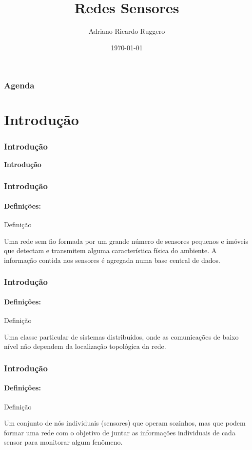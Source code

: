\documentclass[notes]{beamer}
\title{Redes Sensores}
\subtitle{}
\author{Adriano Ricardo Ruggero}
\institute{Instituto de Computação - Unicamp}
\date{\today}
\begin{document}
\begin{frame}
\label{slide_1}
  \titlepage

\end{frame}

\begin{frame}
\label{slide_2}
  \frametitle{Agenda}
  \tableofcontents
\end{frame}

\section{Introdução}
\begin{frame}
\label{slide_3}
\frametitle{Introdução}

\begin{block}

 \center \textbf{Introdução}
 
\end{block}

\end{frame}

\begin{frame}
\label{slide_4}
\frametitle{Introdução}
\framesubtitle{Definições:} 

\begin{block}{Definição}

Uma rede sem fio formada por um grande número de sensores pequenos e imóveis  que detectam e transmitem alguma característica física do ambiente. A informação contida nos sensores é agregada numa base central de dados. \nocite{Malladi_1}

\end{block}

\end{frame}

\begin{frame}
\label{slide_5}
\frametitle{Introdução}
\framesubtitle{Definições:} 

\begin{block}{Definição}

Uma classe particular de sistemas distribuídos, onde as comunicações de baixo
nível não dependem da localização topológica da rede. \nocite{Huang_2}

\end{block}

\end{frame}

\begin{frame}
\label{slide_6}
\frametitle{Introdução}
\framesubtitle{Definições:} 

\begin{block}{Definição}

Um conjunto de nós individuais (sensores) que operam sozinhos, mas que podem formar uma rede com o objetivo de juntar as informações individuais de cada sensor para monitorar algum fenômeno.

\end{block}

\end{frame}
\end{document}
